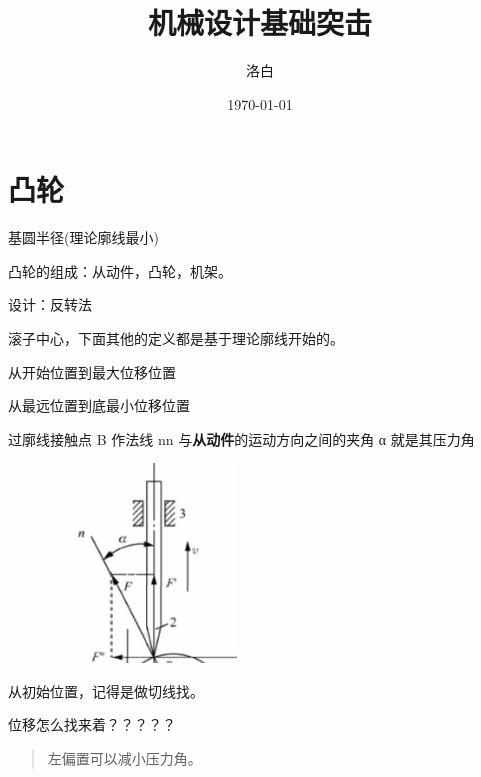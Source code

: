 \documentclass[twocolumn]{ctexart}
\title{机械设计基础突击}
\author{洛白}
\date{\today}
\begin{document}


\setlength{\parskip}{0em}
\renewcommand{\baselinestretch}{1.53}

\section{凸轮}
基圆半径(理论廓线最小)

凸轮的组成：从动件，凸轮，机架。

设计：反转法

\begin{description}[leftmargin=1.7cm,style=nextline,nosep]%
  \item[理论廓线] 滚子中心，下面其他的定义都是基于理论廓线开始的。
  \item[偏置圆]
  \item[基圆]
  \item[推程] 从开始位置到最大位移位置
  \item[回程] 从最远位置到底最小位移位置 
  \item[压力角] 过廓线接触点 B 作法线 nn 与\textbf{从动件}的运动方向之间的夹角 α 就是其压力角 
          \begin{figure}[H]
              \centering
              \includegraphics[width=5cm]{img/15.png}
              \end{figure}    
  \item[凸轮转角] 从初始位置，记得是做切线找。
  \item[位移] 位移怎么找来着？？？？？ 
  \item[最大位移]  
\end{description}

\begin{quote}
{\qquad{}\ccwd\kaishu{}
左偏置可以减小压力角。
}
\end{quote}
\end{document}
